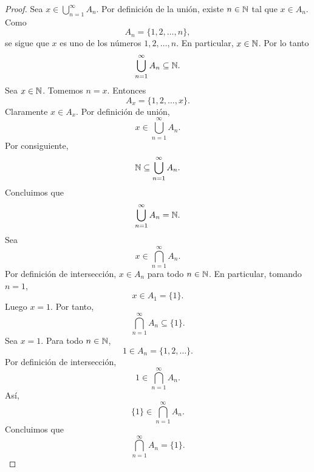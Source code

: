 \documentclass[12pt,a4paper]{book}
\begin{document}
    \begin{proof}
        Sea $x\in\bigcup_{n=1}^{\infty}A_{n}$. Por definición de la unión, existe $n\in\mathbb{N}$ tal que $x\in A_{n}$.
        Como
        \begin{equation*}
            A_{n}=\{1,2,\dots,n\},
        \end{equation*}
        se sigue que $x$ es uno de los números $1,2,\dots,n$. En particular, $x\in\mathbb{N}$. Por lo tanto
        \begin{equation*}
            \bigcup_{n=1}^{\infty}A_{n}\subseteq\mathbb{N}.
        \end{equation*}
        Sea $x\in\mathbb{N}$. Tomemos $n=x$. Entonces
        \begin{equation*}
            A_{x}=\{1,2,\dots,x\}.
        \end{equation*}
        Claramente $x\in A_{x}$. Por definición de unión,
        \begin{equation*}
            x\in\bigcup_{n=1}^{\infty}A_{n}.
        \end{equation*}
        Por consiguiente,
        \begin{equation*}
            \mathbb{N}\subseteq\bigcup_{n=1}^{\infty}A_{n}.
        \end{equation*}
        Concluimos que
        \begin{equation*}
            \bigcup_{n=1}^{\infty}A_{n}=\mathbb{N}.
        \end{equation*}
        Sea
        \begin{equation*}
            x\in\bigcap_{n=1}^{\infty}A_{n}.
        \end{equation*}
        Por definición de intersección, $x\in A_{n}$ para todo $n\in\mathbb{N}$. En particular, tomando $n=1$,
        \begin{equation*}
            x\in A_{1}=\{1\}.
        \end{equation*}
        Luego $x=1$. Por tanto,
        \begin{equation*}
            \bigcap_{n=1}^{\infty}A_{n}\subseteq\{1\}.
        \end{equation*}
        Sea $x=1$. Para todo $n\in\mathbb{N}$,
        \begin{equation*}
            1\in A_{n}=\{1,2,\dots\}.
        \end{equation*}
        Por definición de intersección,
        \begin{equation*}
            1\in\bigcap_{n=1}^{\infty}A_{n}.
        \end{equation*}
        Así,
        \begin{equation*}
            \{1\}\in\bigcap_{n=1}^{\infty}A_{n}.
        \end{equation*}
        Concluimos que
        \begin{equation*}
            \bigcap_{n=1}^{\infty}A_{n}=\{1\}.
        \end{equation*}
    \end{proof}
\end{document}
